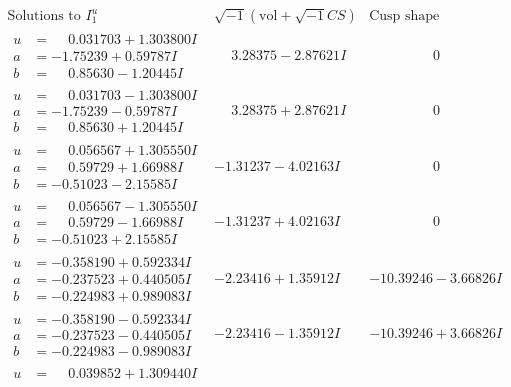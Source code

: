 \documentclass[1p]{elsarticle_modified}
\theoremstyle{definition}
\newcommand{\I}{\sqrt{-1}}
\begin{document}
$$\begin{array}{c|c|c}
\text{Solutions to }I^u_{1}& \I (\text{vol} + \sqrt{-1}CS) & \text{Cusp shape}\\
 \hline 
\begin{aligned}
u &= \phantom{-}0.031703 + 1.303800 I \\
a &= -1.75239 + 0.59787 I \\
b &= \phantom{-}0.85630 - 1.20445 I\end{aligned}
 & \phantom{-}3.28375 - 2.87621 I & \phantom{-0.000000 } 0 \\ \hline\begin{aligned}
u &= \phantom{-}0.031703 - 1.303800 I \\
a &= -1.75239 - 0.59787 I \\
b &= \phantom{-}0.85630 + 1.20445 I\end{aligned}
 & \phantom{-}3.28375 + 2.87621 I & \phantom{-0.000000 } 0 \\ \hline\begin{aligned}
u &= \phantom{-}0.056567 + 1.305550 I \\
a &= \phantom{-}0.59729 + 1.66988 I \\
b &= -0.51023 - 2.15585 I\end{aligned}
 & -1.31237 - 4.02163 I & \phantom{-0.000000 } 0 \\ \hline\begin{aligned}
u &= \phantom{-}0.056567 - 1.305550 I \\
a &= \phantom{-}0.59729 - 1.66988 I \\
b &= -0.51023 + 2.15585 I\end{aligned}
 & -1.31237 + 4.02163 I & \phantom{-0.000000 } 0 \\ \hline\begin{aligned}
u &= -0.358190 + 0.592334 I \\
a &= -0.237523 + 0.440505 I \\
b &= -0.224983 + 0.989083 I\end{aligned}
 & -2.23416 + 1.35912 I & -10.39246 - 3.66826 I \\ \hline\begin{aligned}
u &= -0.358190 - 0.592334 I \\
a &= -0.237523 - 0.440505 I \\
b &= -0.224983 - 0.989083 I\end{aligned}
 & -2.23416 - 1.35912 I & -10.39246 + 3.66826 I \\ \hline\begin{aligned}
u &= \phantom{-}0.039852 + 1.309440 I \\

\end{aligned}
\end{array}$$
\end{document}
